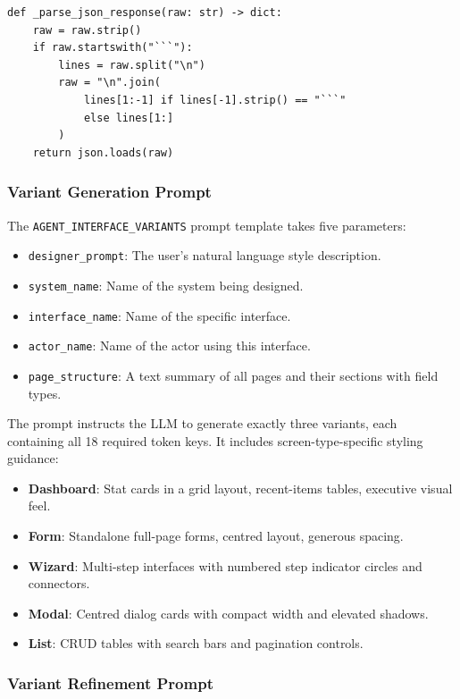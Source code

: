 \begin{verbatim}
def _parse_json_response(raw: str) -> dict:
    raw = raw.strip()
    if raw.startswith("```"):
        lines = raw.split("\n")
        raw = "\n".join(
            lines[1:-1] if lines[-1].strip() == "```" 
            else lines[1:]
        )
    return json.loads(raw)
\end{verbatim}

\subsubsection{Variant Generation Prompt}

The \texttt{AGENT\_INTERFACE\_VARIANTS} prompt template takes five parameters:
\begin{itemize}
    \item \texttt{designer\_prompt}: The user's natural language style description.
    \item \texttt{system\_name}: Name of the system being designed.
    \item \texttt{interface\_name}: Name of the specific interface.
    \item \texttt{actor\_name}: Name of the actor using this interface.
    \item \texttt{page\_structure}: A text summary of all pages and their sections with field types.
\end{itemize}

The prompt instructs the LLM to generate exactly three variants, each containing all 18 required token keys. It includes screen-type-specific styling guidance:
\begin{itemize}
    \item \textbf{Dashboard}: Stat cards in a grid layout, recent-items tables, executive visual feel.
    \item \textbf{Form}: Standalone full-page forms, centred layout, generous spacing.
    \item \textbf{Wizard}: Multi-step interfaces with numbered step indicator circles and connectors.
    \item \textbf{Modal}: Centred dialog cards with compact width and elevated shadows.
    \item \textbf{List}: CRUD tables with search bars and pagination controls.
\end{itemize}


\subsubsection{Variant Refinement Prompt}

